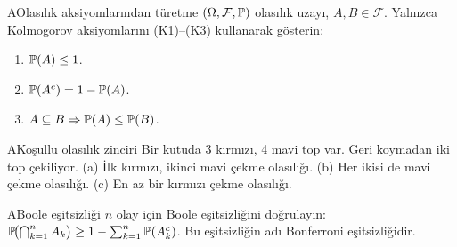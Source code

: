 \alistirmalar

\begin{alistirma}[Al.2.5]{A}{Olasılık aksiyomlarından türetme}
$(\Omega,\mathcal{F},\mathbb{P})$ olasılık uzayı, $A, B \in \mathcal{F}$.
Yalnızca Kolmogorov aksiyomlarını (K1)--(K3) kullanarak gösterin:
\begin{enumerate}[label=(\alph*)]
  \item $\mathbb{P}(A) \leq 1$.
  \item $\mathbb{P}(A^c) = 1 - \mathbb{P}(A)$.
  \item $A \subseteq B \Rightarrow \mathbb{P}(A) \leq \mathbb{P}(B)$.
\end{enumerate}
\end{alistirma}

\begin{alistirma}[Al.2.6]{A}{Koşullu olasılık zinciri}
Bir kutuda 3 kırmızı, 4 mavi top var. Geri koymadan iki top çekiliyor.
(a) İlk kırmızı, ikinci mavi çekme olasılığı.
(b) Her ikisi de mavi çekme olasılığı.
(c) En az bir kırmızı çekme olasılığı.
\end{alistirma}

\begin{alistirma}[Al.2.7]{A}{Boole eşitsizliği}
$n$ olay için Boole eşitsizliğini doğrulayın:
$\mathbb{P}\!\bigl(\bigcap_{k=1}^n A_k\bigr) \geq 1 - \sum_{k=1}^n \mathbb{P}(A_k^c)$.
Bu eşitsizliğin adı Bonferroni eşitsizliğidir.
\end{alistirma}


